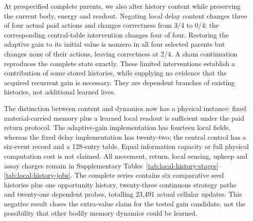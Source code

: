 At prespecified complete parents, we also alter history content while preserving the current body, energy and readout. Negating local delay content changes three of four actual paid actions and changes correctness from 3/4 to 0/4; the corresponding central-table intervention changes four of four. Restoring the adaptive gain to its initial value is nonzero in all four selected parents but changes none of their actions, leaving correctness at 2/4. A sham continuation reproduces the complete state exactly. These limited interventions establish a contribution of some stored histories, while supplying no evidence that the acquired recurrent gain is necessary. They are dependent branches of existing histories, not additional learned lives.

The distinction between content and dynamics now has a physical instance: fixed material-carried memory plus a learned local readout is sufficient under the paid return protocol. The adaptive-gain implementation has fourteen local fields, whereas the fixed delay implementation has twenty-two; the central control has a six-event record and a 128-entry table. Equal information capacity or full physical computation cost is not claimed. All movement, return, local sensing, upkeep and assay charges remain in Supplementary Tables~\ref{tab:local-history-stages}--\ref{tab:local-history-jobs}. The complete series contains six comparative seed histories plus one opportunity history, twenty-three continuous strategy paths and twenty-one dependent probes, totalling 23,491 actual cellular updates. This negative result closes the extra-value claim for the tested gain candidate, not the possibility that other bodily memory dynamics could be learned.


